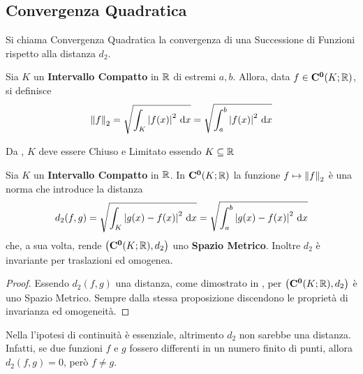 \subsection{Convergenza Quadratica}\label{sect:conv_quadr}
Si chiama Convergenza Quadratica la convergenza di una Successione di Funzioni rispetto alla distanza $d_2$.
\begin{definition}
	Sia $K$ un \textbf{Intervallo Compatto} in $\mathbb{R}$ di estremi $a, b$. Allora, data $f \in \mathbf{C^{0}}(K; \mathbb{R})$, si definisce
	\[\left\|f\right\|_2 = \sqrt{\int_{K} \left|f(x)\right|^2 \,\mathrm{d}{x}} = \sqrt{\int_{a}^{b} \left|f(x)\right|^2 \,\mathrm{d}{x}}\]
	\begin{note}
		Da , $K$ deve essere Chiuso e Limitato essendo $K \subseteq \mathbb{R}$
	\end{note}
\end{definition}
\begin{proposition}
	\label{def:dist_quadratica}
	Sia $K$ un \textbf{Intervallo Compatto} in $\mathbb{R}$. In $\mathbf{C^{0}}(K; \mathbb{R})$ la funzione $f \mapsto \left\|f\right\|_2$ è una norma che introduce la distanza
	\[d_2(f, g) = \sqrt{\int_{K} \left|g(x) - f(x)\right|^2 \,\mathrm{d}{x}} = \sqrt{\int_{a}^{b} \left|g(x) - f(x)\right|^2 \,\mathrm{d}{x}}\]
	che, a sua volta, rende $\bigl( \mathbf{C^{0}}(K; \mathbb{R}), d_2 \bigr)$ uno \textbf{Spazio Metrico}. Inoltre $d_2$ è invariante per traslazioni ed omogenea.

	\begin{proof}
		Essendo $d_2(f,g)$ una distanza, come dimostrato in \hyperref[ex:dim_dist_quadratica]{},
		per  $\bigl( \mathbf{C^{0}}(K; \mathbb{R}), d_2 \bigr)$ è uno Spazio Metrico. Sempre dalla stessa proposizione discendono le proprietà di invarianza ed omogeneità.
	\end{proof}
\end{proposition}
\begin{example}
	\label{ex:d2_deve_essere_di_f_C0}
	Nella  l'ipotesi di continuità è essenziale, altrimento $d_2$ non sarebbe una distanza.\\
	Infatti, se due funzioni $f$ e $g$ fossero differenti in un numero finito di punti, allora $d_2(f,g) = 0$, però $f \neq g$.
\end{example}
